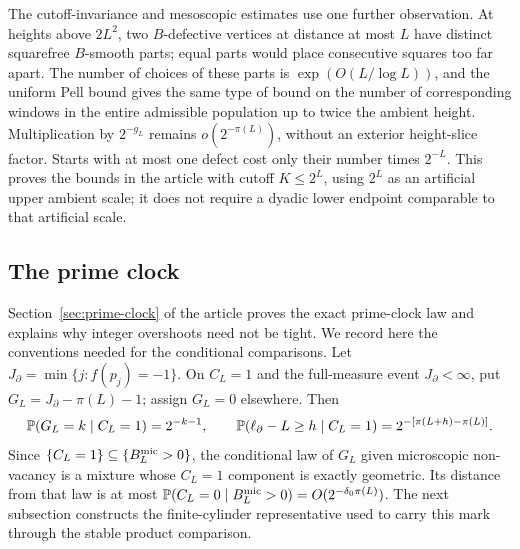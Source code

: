 The cutoff-invariance and mesoscopic estimates use one further
observation. At heights above $2L^2$, two $B$-defective vertices at
distance at most $L$ have distinct squarefree $B$-smooth parts; equal
parts would place consecutive squares too far apart. The number of
choices of these parts is $\exp(O(L/\log L))$, and the uniform Pell
bound gives the same type of bound on the number of corresponding windows in the entire admissible population
up to twice the ambient height. Multiplication by $2^{-g_L}$ remains
$o(2^{-\pi(L)})$, without an exterior height-slice factor. Starts with at most one defect
cost only their number times $2^{-L}$. This proves the bounds in the
article with cutoff $K\le2^L$, using $2^L$ as an artificial upper
ambient scale; it does not require a dyadic lower endpoint comparable
to that artificial scale.

\subsection{The prime clock}
Section~\ref{sec:prime-clock} of the article proves the exact prime-clock
law and explains why integer overshoots need not be tight. We record here
the conventions needed for the conditional comparisons. Let
$J_\partial=\min\{j:f(p_j)=-1\}$. On $C_L=1$ and the full-measure
event $J_\partial<\infty$, put $G_L=J_\partial-\pi(L)-1$;
assign $G_L=0$ elsewhere. Then
\[
 \mathbb P(G_L=k\mid C_L=1)=2^{-k-1},\qquad
 \mathbb P(\ell_\partial-L\ge h\mid C_L=1)
             =2^{-[\pi(L+h)-\pi(L)]}.
\]
Since $\{C_L=1\}\subseteq\{B_L^{\rm mic}>0\}$, the conditional
law of $G_L$ given microscopic non-vacancy is a mixture whose
$C_L=1$ component is exactly geometric. Its distance from that law is
at most $\mathbb P(C_L=0\mid B_L^{\rm mic}>0)=O(2^{-\delta_0\pi(L)})$.
The next subsection constructs the finite-cylinder representative used
to carry this mark through the stable product comparison.

